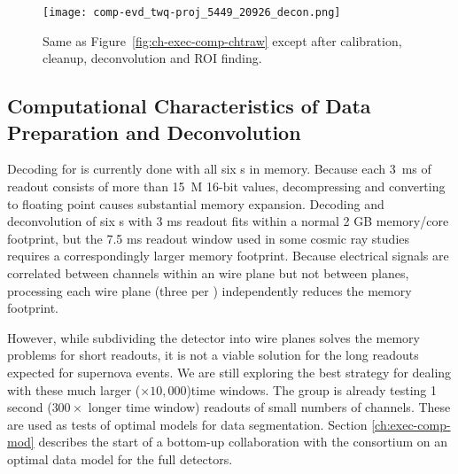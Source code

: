 \begin{figure}[t]
 \texttt{[image: comp-evd\_twq-proj\_5449\_20926\_decon.png]}
\caption{
Same as Figure~\ref{fig:ch-exec-comp-chtraw} except after calibration, cleanup, deconvolution and ROI finding. 
}
\label{fig:ch-exec-comp-chtroi}
\end{figure}

\subsection{Computational Characteristics of Data Preparation and Deconvolution }
Decoding for  is currently done with all six s in memory. Because each \SI{3}{ms} of  readout consists of more than \SI{15}{M} 16-bit values, decompressing and converting to floating point causes substantial memory expansion.  Decoding and deconvolution of six s with 3 ms readout fits within a normal 2 GB memory/core footprint, but the 7.5 ms readout window used in some cosmic ray studies requires a correspondingly larger memory footprint. Because electrical signals are correlated between channels within an  wire plane but not between planes, processing each wire plane (three per ) independently reduces the memory footprint.  %


However,  while subdividing the detector into wire planes solves the memory problems for short readouts, it is  not a viable solution for the long readouts expected for supernova events. We are still exploring the best strategy for dealing with these much larger ($\times 10,000$)time windows. The  group is already testing 1 second ($300 \times$ longer time window) readouts of small numbers of channels.  These are used as tests of optimal models for data segmentation.  Section \ref{ch:exec-comp-mod} describes the start of a bottom-up collaboration with the  consortium on an optimal data model for the full  detectors. 

